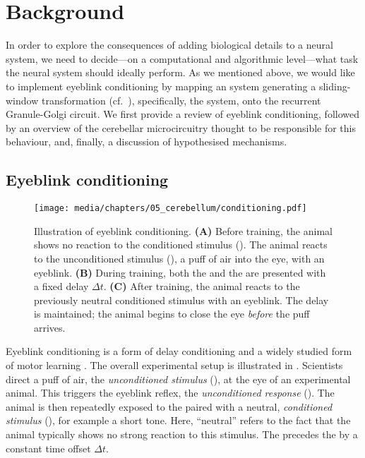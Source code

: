 
\section{Background}

In order to explore the consequences of adding biological details to a neural system, we need to decide---on a computational and algorithmic level---what task the neural system should ideally perform.
As we mentioned above, we would like to implement eyeblink conditioning by mapping an \LTI system generating a sliding-window transformation (cf.~), specifically, the \LDN system, onto the recurrent Granule-Golgi circuit.
We first provide a review of eyeblink conditioning, followed by an overview of the cerebellar microcircuitry thought to be responsible for this behaviour, and, finally, a discussion of hypothesised mechanisms.

\subsection{Eyeblink conditioning}

\begin{figure}
	\texttt{[image: media/chapters/05\_cerebellum/conditioning.pdf]}
	\caption[Illustration of eyeblink conditioning.]{
	Illustration of eyeblink conditioning.
	\textbf{(A)} Before training, the animal shows no reaction to the conditioned stimulus (\CS).
	The animal reacts to the unconditioned stimulus (\US), a puff of air into the eye, with an eyeblink.
	\textbf{(B)} During training, both the \CS and the \US are presented with a fixed delay $\Delta t$.
	\textbf{(C)} After training, the animal reacts to the previously neutral conditioned stimulus with an eyeblink. The delay is maintained; the animal begins to close the eye \emph{before} the puff arrives.
	}
	\label{fig:conditioning}
\end{figure}

Eyeblink conditioning is a form of delay conditioning and a widely studied form of motor learning \citep[e.g.,][Chapter~42, pp.~975-979]{kandel2012principles}.
The overall experimental setup is illustrated in .
Scientists direct a puff of air, the \emph{unconditioned stimulus} (\US), at the eye of an experimental animal.
This triggers the eyeblink reflex, the \emph{unconditioned response} (\UR).
The animal is then repeatedly exposed to the \US paired with a neutral, \emph{conditioned stimulus} (\CS), for example a short tone.
Here, \enquote{neutral} refers to the fact that the animal typically shows no strong reaction to this stimulus.
The \CS precedes the \US by a constant time offset $\Delta t$.

